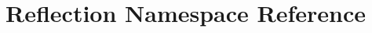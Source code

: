 \hypertarget{namespaceReflection}{}\section{Reflection Namespace Reference}
\label{namespaceReflection}
